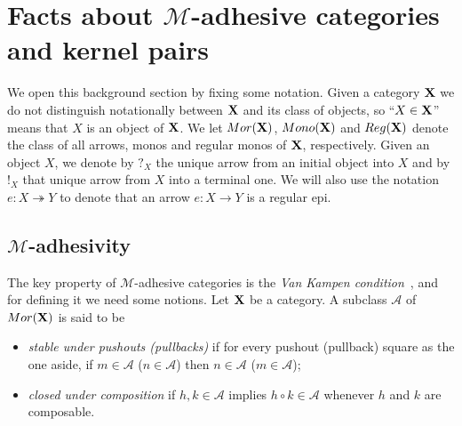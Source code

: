 \documentclass[a4paper,UKenglish,cleveref,pdftex,thm-restate,numberwithinsect]{lipics-v2021}
\def\X{\textbf {\textup{X}}}
\newcommand{\mor}{\mathsf{Mor}}
\newcommand{\mon}{\mathsf{Mono}}
\newcommand{\reg}{\mathsf{Reg}}
\newcommand{\eto}{\twoheadrightarrow}
\begin{document}
\section{Facts about $\mathcal{M}$-adhesive categories and kernel pairs}\label{sec:ade}


%
We open this background section by fixing some notation.
%
Given a category $\X$ we do not distinguish notationally between $\X$ and its class of objects, so
``$X\in \X$'' means that $X$ is an object of $\X$. We let $\mor(\X)$, $\mon(\X)$ and $\reg(\X)$ denote the class of all arrows, monos and regular monos of $\X$, respectively.  Given an object $X$, we  denote by $?_X$ the unique arrow from an initial object into $X$ and by $!_X$ that  unique arrow from $X$ into a terminal one. We will also use the notation $e\colon X\eto Y$ to denote that an arrow $e\colon X\to Y$ is a regular epi. 

\subsection{$\mathcal{M}$-adhesivity}\label{subsec:ade}
The key property of $\mathcal{M}$-adhesive categories is the \emph{Van Kampen condition}~\cite{brown1997van,johnstone2007quasitoposes,lack2005adhesive},
%
and for defining it we need some notions.
Let  $\X$ be a category. A subclass $\mathcal{A}$ of $\mor(\X)$ is said to be

\parbox{11cm}{\begin{itemize}
	\item		\emph{stable under pushouts (pullbacks)} if for every pushout (pullback) square as the one aside, if $m \in \mathcal{A}$ ($n\in \mathcal{A}$) then $n \in \mathcal{A}$ ($m \in \mathcal{A}$);
		\item \emph{closed under composition} if $h, k\in \mathcal{A}$ implies $h\circ k\in \mathcal{A}$ whenever $h$ and $k$ are composable.
\end{itemize}}\hfill
\parbox{1cm}{
}
\end{document}
